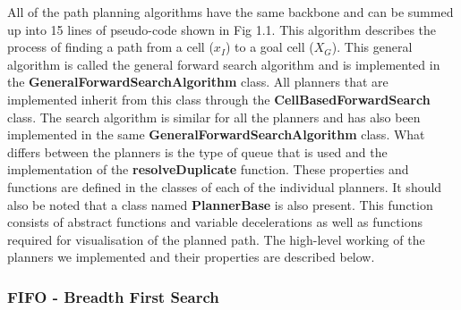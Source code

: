 \documentclass[a4paper,12pt]{article}
\begin{document}
			All of the path planning algorithms have the same backbone and can be summed up into 15 lines of pseudo-code shown in Fig 1.1. This algorithm describes the process of finding a path from a cell ($x_I$) to a goal cell ($X_G$). This general algorithm is called the general forward search algorithm and is implemented in the \textbf{GeneralForwardSearchAlgorithm} class. All planners that are implemented inherit from this class through the \textbf{CellBasedForwardSearch} class. The search algorithm is similar for all the planners and has also been implemented in the same \textbf{GeneralForwardSearchAlgorithm} class. What differs between the planners is the type of queue that is used and the implementation of the \textbf{resolveDuplicate} function. These properties and functions are defined in the classes of each of the individual planners. It should also be noted that a class named \textbf{PlannerBase} is also present. This function consists of abstract functions and variable decelerations as well as functions required for visualisation of the planned path. The high-level working of the planners we implemented and their properties are described below.
			
			\subsubsection{FIFO - Breadth First Search}
	
\end{document}
